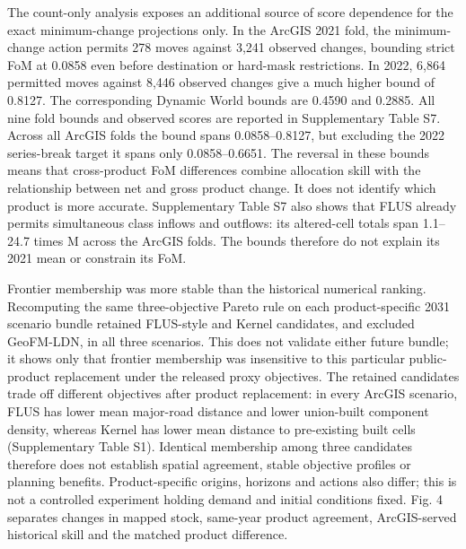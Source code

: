 The count-only analysis exposes an additional source of score dependence
for the exact minimum-change projections only. In the ArcGIS 2021 fold,
the minimum-change action permits 278 moves against 3,241 observed
changes, bounding strict FoM at 0.0858 even before destination or
hard-mask restrictions. In 2022, 6,864 permitted moves against 8,446
observed changes give a much higher bound of 0.8127. The corresponding
Dynamic World bounds are 0.4590 and 0.2885. All nine fold bounds and
observed scores are reported in Supplementary Table S7. Across all
ArcGIS folds the bound spans 0.0858--0.8127, but excluding the 2022
series-break target it spans only 0.0858--0.6651. The reversal in these
bounds means that cross-product FoM differences combine allocation skill
with the relationship between net and gross product change. It does not
identify which product is more accurate. Supplementary Table S7 also
shows that FLUS already permits simultaneous class inflows and outflows:
its altered-cell totals span 1.1--24.7 times M across the ArcGIS folds.
The bounds therefore do not explain its 2021 mean or constrain its FoM.

Frontier membership was more stable than the historical numerical
ranking. Recomputing the same three-objective Pareto rule on each
product-specific 2031 scenario bundle retained FLUS-style and Kernel
candidates, and excluded GeoFM-LDN, in all three scenarios. This does
not validate either future bundle; it shows only that frontier
membership was insensitive to this particular public-product replacement
under the released proxy objectives. The retained candidates trade off
different objectives after product replacement: in every ArcGIS
scenario, FLUS has lower mean major-road distance and lower union-built
component density, whereas Kernel has lower mean distance to
pre-existing built cells (Supplementary Table S1). Identical membership
among three candidates therefore does not establish spatial agreement,
stable objective profiles or planning benefits. Product-specific
origins, horizons and actions also differ; this is not a controlled
experiment holding demand and initial conditions fixed. Fig. 4 separates
changes in mapped stock, same-year product agreement, ArcGIS-served
historical skill and the matched product difference.

